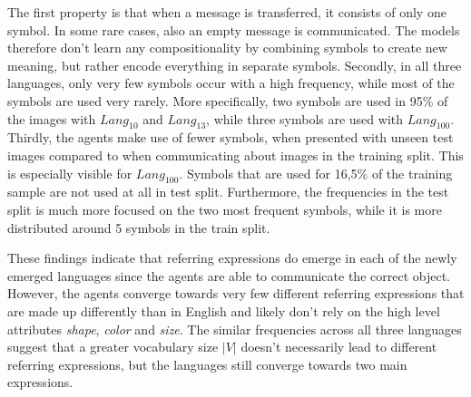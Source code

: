 The first property is that when a message is transferred, it consists of only one symbol.
In some rare cases, also an empty message is communicated.
The models therefore don't learn any compositionality by combining symbols to create new meaning, but rather encode everything in separate symbols.
Secondly, in all three languages, only very few symbols occur with a high frequency, while most of the symbols are used very rarely.
More specifically, two symbols are used in 95\% of the images with $Lang_{10}$ and $Lang_{13}$, while three symbols are used with $Lang_{100}$.
Thirdly, the agents make use of fewer symbols, when presented with unseen test images compared to when communicating about images in the training split.
This is especially visible for $Lang_{100}$.
Symbols that are used for 16,5\% of the training sample are not used at all in test split.
Furthermore, the frequencies in the test split is much more focused on the two most frequent symbols, while it is more distributed around 5 symbols in the train split.

These findings indicate that referring expressions do emerge in each of the newly emerged languages since the agents are able to communicate the correct object.
However, the agents converge towards very few different referring expressions that are made up differently than in English and likely don't rely on the high level attributes \emph{shape}, \emph{color} and \emph{size}.
The similar frequencies across all three languages suggest that a greater vocabulary size $|V|$ doesn't necessarily lead to different referring expressions, but the languages still converge towards two main expressions.

